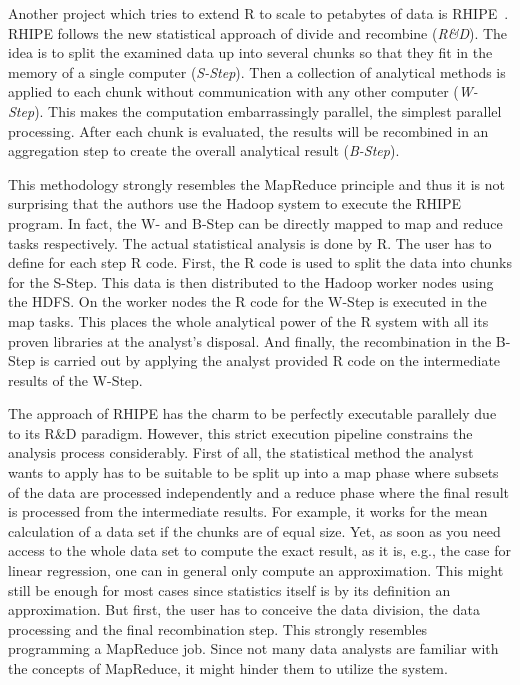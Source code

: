 Another project which tries to extend R to scale to petabytes of data is RHIPE~\cite{guha:s2012a}.
RHIPE follows the new statistical approach of divide and recombine (\emph{R\&D}).
The idea is to split the examined data up into several chunks so that they fit in the memory of a single computer (\emph{S-Step}).
Then a collection of analytical methods is applied to each chunk without communication with any other computer (\emph{W-Step}).
This makes the computation embarrassingly parallel, the simplest parallel processing.
After each chunk is evaluated, the results will be recombined in an aggregation step to create the overall analytical result (\emph{B-Step}).

This methodology strongly resembles the MapReduce principle and thus it is not surprising that the authors use the Hadoop system to execute the RHIPE program.
In fact, the W- and B-Step can be directly mapped to map and reduce tasks respectively.
The actual statistical analysis is done by R.
The user has to define for each step R code.
First, the R code is used to split the data into chunks for the S-Step.
This data is then distributed to the Hadoop worker nodes using the HDFS.
On the worker nodes the R code for the W-Step is executed in the map tasks.
This places the whole analytical power of the R system with all its proven libraries at the analyst's disposal.
And finally, the recombination in the B-Step is carried out by applying the analyst provided R code on the intermediate results of the W-Step.

The approach of RHIPE has the charm to be perfectly executable parallely due to its R\&D paradigm.
However, this strict execution pipeline constrains the analysis process considerably.
First of all, the statistical method the analyst wants to apply has to be suitable to be split up into a map phase where subsets of the data are processed independently and a reduce phase where the final result is processed from the intermediate results.
For example, it works for the mean calculation of a data set if the chunks are of equal size.
Yet, as soon as you need access to the whole data set to compute the exact result, as it is, e.g., the case for linear regression, one can in general only compute an approximation.
This might still be enough for most cases since statistics itself is by its definition an approximation.
But first, the user has to conceive the data division, the data processing and the final recombination step.
This strongly resembles programming a MapReduce job.
Since not many data analysts are familiar with the concepts of MapReduce, it might hinder them to utilize the system.

